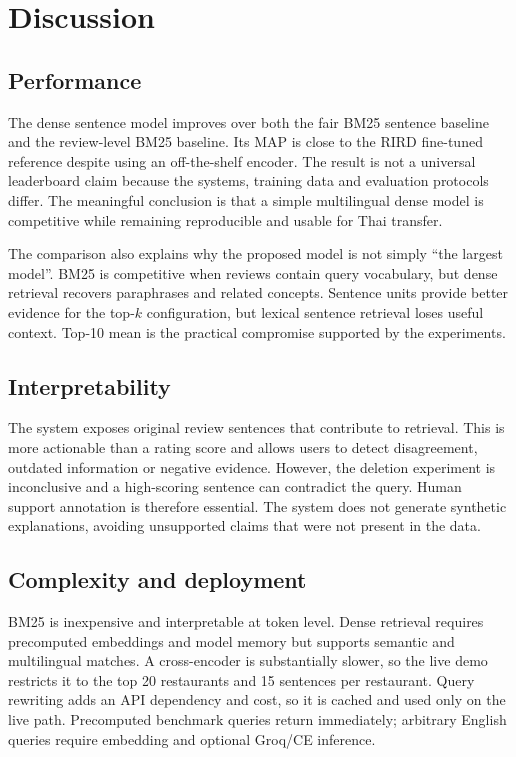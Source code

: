 \chapter{Discussion}

\section{Performance}
The dense sentence model improves over both the fair BM25 sentence baseline and the review-level
BM25 baseline. Its MAP is close to the RIRD fine-tuned reference despite using an off-the-shelf
encoder. The result is not a universal leaderboard claim because the systems, training data and
evaluation protocols differ. The meaningful conclusion is that a simple multilingual dense model
is competitive while remaining reproducible and usable for Thai transfer.

The comparison also explains why the proposed model is not simply ``the largest model''. BM25
is competitive when reviews contain query vocabulary, but dense retrieval recovers paraphrases
and related concepts. Sentence units provide better evidence for the top-$k$ configuration, but
lexical sentence retrieval loses useful context. Top-10 mean is the practical compromise
supported by the experiments.

\section{Interpretability}
The system exposes original review sentences that contribute to retrieval. This is more
actionable than a rating score and allows users to detect disagreement, outdated information or
negative evidence. However, the deletion experiment is inconclusive and a high-scoring sentence
can contradict the query. Human support annotation is therefore essential. The system does not
generate synthetic explanations, avoiding unsupported claims that were not present in the data.

\section{Complexity and deployment}
BM25 is inexpensive and interpretable at token level. Dense retrieval requires precomputed
embeddings and model memory but supports semantic and multilingual matches. A cross-encoder is
substantially slower, so the live demo restricts it to the top 20 restaurants and 15 sentences
per restaurant. Query rewriting adds an API dependency and cost, so it is cached and used only
on the live path. Precomputed benchmark queries return immediately; arbitrary English queries
require embedding and optional Groq/CE inference.

